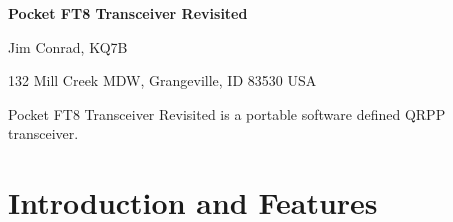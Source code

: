 \documentclass[12pt, letterpaper]{article}
\begin{document}
\vspace*{.5in} %
\begin{center}
    {\LARGE \bfseries Pocket FT8 Transceiver Revisited} \par
    \vspace{0.25in}
    {\large Jim Conrad, KQ7B} \par
    {132 Mill Creek MDW, Grangeville, ID 83530 USA}
\end{center}

\begin{center}
Pocket FT8 Transceiver Revisited is a portable software defined QRPP transceiver.
\end{center}

\section{Introduction and Features}
\end{document}
